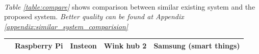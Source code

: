 \documentclass[12pt]{paper}
\begin{document}
		\paragraph{} \textit{Table \ref{table:compare}} shows comparison between similar existing system and the proposed system.  
		\textit{Better quality can be found at Appendix \ref{appendix:similar_system_comparision}}
		\def\arraystretch{1.5}
		\renewcommand\tabularxcolumn[1]{>{\Centering}m{#1}}
		\begin{table}[H]
			
			\begin{center}
				\begin{tabularx}{1\linewidth}{|m{2.2cm}*4{|X}|}\hline
					
					& \textbf{Raspberry Pi} & \textbf{Insteon} & \textbf{Wink hub 2} & \textbf{Samsung (smart things)}  \\\hline
					

\end{tabularx}
\end{center}
\end{table}
\end{document}
